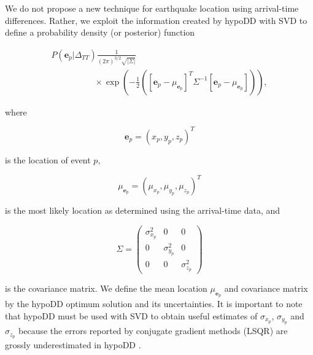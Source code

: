 \documentclass[12pt,double]{article}
\begin{document}
We do not propose a new technique for earthquake location using
arrival-time differences. Rather, we exploit the information created
by hypoDD with SVD to define a probability density (or posterior)
function
\begin{linenomath*} \begin{equation}
\label{eq-multi-var-Gauss-tt}
\begin{array}{l}
P(\mathbf{e}_p|\Delta_{TT})
\frac{1}{(2\pi)^{3/2}\sqrt{|\Sigma|}} \\
\hspace{5em} \times \exp
\left({-\frac{1}{2}\left([\mathbf{e}_p-\mu_{\mathbf{e}_p}]^T
\Sigma^{-1} [\mathbf{e}_p-\mu_{\mathbf{e}_p}]\right)} \right),
\end{array}
\end{equation} \end{linenomath*}
where
\begin{linenomath*} \begin{equation}
\mathbf{e}_p = (x_p,y_p,z_p)^T
\end{equation} \end{linenomath*}
is the location of event $p$,
\begin{linenomath*} \begin{equation}
\mu_{\mathbf{e}_p} = (\mu_{x_p}, \mu_{y_p},\mu_{z_p})^T
\end{equation} \end{linenomath*}
is the most likely location as determined using the arrival-time
data, and
\begin{linenomath*} \begin{equation}
\label{eq:Sigma-expression}
\Sigma = \left( \begin{array}{ccc} \sigma_{x_p}^2 & 0 & 0\\
0 &  \sigma_{y_p}^2 & 0 \\
0 & 0 & \sigma_{z_p}^2  \end{array} \right)
\end{equation} \end{linenomath*}
is the covariance matrix. We define the mean location
$\mu_{\mathbf{e}_p}$ and covariance matrix by the hypoDD optimum
solution and its uncertainties. It is important to note that hypoDD
must be used with SVD to obtain useful estimates of $\sigma_{x_p}$,
$\sigma_{y_p}$ and $\sigma_{z_p}$ because the errors reported by
conjugate gradient methods (LSQR) are grossly underestimated in
hypoDD \citep{dr_Waldhauser01a}.
\end{document}
